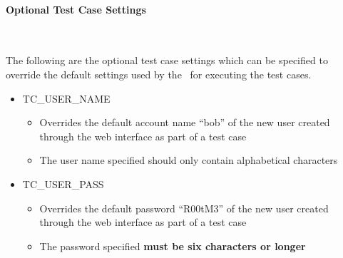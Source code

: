 \paragraph*{Optional Test Case Settings}~\newline

The following are the optional test case settings which can be specified to override
the default settings used by the \cernvmtestframework\ for executing the \cernvmreleasetesting
test cases.

\begin{itemize}
\item	TC\_USER\_NAME
		\begin{itemize}
		\item	Overrides the default account name ``bob'' of the new user created 
				through the web interface as part of a \cernvmreleasetesting test case
		\item	The user name specified should only contain alphabetical characters
		\end{itemize}
		
\item	TC\_USER\_PASS
		\begin{itemize}
		\item	Overrides the default password ``R00tM3'' of the new user created 
				through the web interface as part of a \cernvmreleasetesting test case
		\item	The password specified {\bf must be six characters or longer}
		\end{itemize}
\end{itemize}